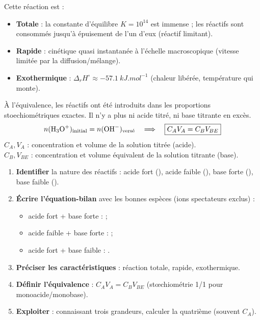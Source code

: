 \documentclass[11pt]{article}
\begin{document}
\begin{propriete}
Cette réaction est :
\begin{itemize}
\item \textbf{Totale} : la constante d'équilibre $K = 10^{14}$ est immense ; les réactifs sont consommés jusqu'à épuisement de l'un d'eux (réactif limitant).
\item \textbf{Rapide} : cinétique quasi instantanée à l'échelle macroscopique (vitesse limitée par la diffusion/mélange).
\item \textbf{Exothermique} : $\Delta_r H^\circ \approx \SI{-57,1}{kJ.mol^{-1}}$ (chaleur libérée, température qui monte).
\end{itemize}
\end{propriete}

\begin{aretenir}
À l'équivalence, les réactifs ont été introduits dans les proportions stoechiométriques exactes. Il n'y a plus ni acide titré, ni base titrante en excès.
\[ n(\ce{H3O+})_{\text{initial}} = n(\ce{OH-})_{\text{versé}} \quad\Longrightarrow\quad \boxed{C_A V_A = C_B V_{BE}} \]
$C_A, V_A$ : concentration et volume de la solution titrée (acide).\\
$C_B, V_{BE}$ : concentration et volume équivalent de la solution titrante (base).
\end{aretenir}

\begin{methode}
\begin{enumerate}
\item \textbf{Identifier} la nature des réactifs : acide fort (), acide faible (), base forte (), base faible ().
\item \textbf{Écrire l'équation-bilan} avec les bonnes espèces (ions spectateurs exclus) :
\begin{itemize}
\item acide fort + base forte :  ;
\item acide faible + base forte :  ;
\item acide fort + base faible : .
\end{itemize}
\item \textbf{Préciser les caractéristiques} : réaction totale, rapide, exothermique.
\item \textbf{Définir l'équivalence} : $C_A V_A = C_B V_{BE}$ (stœchiométrie 1/1 pour monoacide/monobase).
\item \textbf{Exploiter} : connaissant trois grandeurs, calculer la quatrième (souvent $C_A$).
\end{enumerate}
\end{methode}
\end{document}
